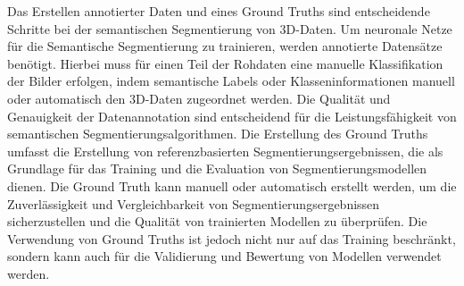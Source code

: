 Das Erstellen annotierter Daten und eines Ground Truths sind entscheidende
Schritte bei der semantischen Segmentierung von 3D-Daten. Um neuronale Netze
für die Semantische Segmentierung zu trainieren, werden annotierte Datensätze
benötigt. Hierbei muss für einen Teil der Rohdaten eine manuelle Klassifikation
der Bilder erfolgen, indem semantische Labels oder Klasseninformationen manuell
oder automatisch den 3D-Daten zugeordnet werden. Die Qualität und Genauigkeit
der Datenannotation sind entscheidend für die Leistungsfähigkeit von
semantischen Segmentierungsalgorithmen. Die Erstellung des Ground Truths
umfasst die Erstellung von referenzbasierten Segmentierungsergebnissen, die als
Grundlage für das Training und die Evaluation von Segmentierungsmodellen
dienen. Die Ground Truth kann manuell oder automatisch erstellt werden, um die
Zuverlässigkeit und Vergleichbarkeit von Segmentierungsergebnissen
sicherzustellen und die Qualität von trainierten Modellen zu überprüfen. Die
Verwendung von Ground Truths ist jedoch nicht nur auf das Training beschränkt,
sondern kann auch für die Validierung und Bewertung von Modellen verwendet
werden.